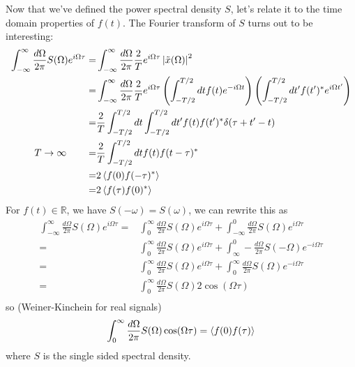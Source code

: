 \documentclass{article}
\begin{document}

Now that we've defined the power spectral density $S$, let's relate it to the time domain properties of $f(t)$.
The Fourier transform of $S$ turns out to be interesting:
\begin{align*}
  \int_{-\infty}^\infty \frac{d\Omega}{2\pi} S(\Omega) e^{i \Omega \tau}
  =& \int_{-\infty}^\infty \frac{d\Omega}{2\pi} \frac{2}{T} e^{i \Omega \tau} \left\lvert \tilde{x}(\Omega) \right \rvert^2 \\
  =& \int_{-\infty}^\infty \frac{d\Omega}{2\pi} \frac{2}{T} e^{i \Omega \tau}
    \left( \int_{-T/2}^{T/2} dt f(t) e^{-i \Omega t} \right)
    \left( \int_{-T/2}^{T/2} dt' f(t')^* e^{i \Omega t'} \right) \\
  =& \frac{2}{T} \int_{-T/2}^{T/2} dt \int_{-T/2}^{T/2} dt' f(t) f(t')^* \delta(\tau + t' - t) \\
  T \to \infty \qquad =& \frac{2}{T} \int_{-T/2}^{T/2} dt f(t) f(t - \tau)^* \\
  =& 2 \left \langle f(0)f(-\tau)^* \right \rangle \\
  =& 2 \left \langle f(\tau) f(0)^* \right \rangle
\end{align*}
For $f(t) \in \mathbb{R}$, we have $S(-\omega) = S(\omega)$, we can rewrite this as
\begin{align*}
  \int_{-\infty}^\infty \frac{d\Omega}{2\pi} S(\Omega) e^{i \Omega \tau}
  =& \int_0^\infty \frac{d\Omega}{2\pi} S(\Omega) e^{i \Omega \tau} + \int_{-\infty}^0 \frac{d\Omega}{2\pi} S(\Omega) e^{i \Omega \tau} \\
  =& \int_0^\infty \frac{d\Omega}{2\pi} S(\Omega) e^{i \Omega \tau} + \int_{\infty}^0 - \frac{d\Omega}{2\pi} S(-\Omega) e^{-i \Omega \tau} \\
  =& \int_0^\infty \frac{d\Omega}{2\pi} S(\Omega) e^{i \Omega \tau} + \int_0^\infty \frac{d\Omega}{2\pi} S(\Omega) e^{-i \Omega \tau} \\
  =& \int_0^\infty \frac{d\Omega}{2\pi} S(\Omega) 2 \cos(\Omega \tau) \\
\end{align*}
so (Weiner-Kinchein for real signals)
\begin{equation*}
\int_0^\infty \frac{d\Omega}{2\pi} S(\Omega) \cos(\Omega \tau) = \left \langle f(0) f(\tau) \right \rangle
\end{equation*}
where $S$ is the single sided spectral density.
\end{document}
